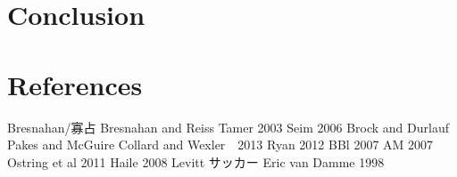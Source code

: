 \documentclass{jsarticle}
\begin{document}

\section{Conclusion}

\section{References}
\begin{thebibliography}{10}
	 Bresnahan/寡占
	 Bresnahan and Reiss
	 Tamer 2003
	 Seim 2006
	 Brock and Durlauf
	 Pakes and McGuire
	 Collard and Wexler　2013
	 Ryan 2012
	 BBl 2007
	 AM 2007
	 Ostring et al 2011
	 Haile 2008
	 Levitt サッカー
	 Eric van Damme 1998
\end{thebibliography}
\end{document}
